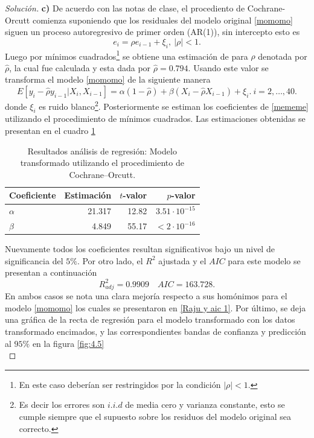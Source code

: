 \documentclass[10.5pt,notitlepage]{article}
\newenvironment{solucion}
  {\begin{proof}[Solución]}
  {\end{proof}}
\newcommand{\abs}[1]{\left\lvert #1 \right\rvert}
\theoremstyle{plain}
\begin{document}
\begin{solucion}
\noindent \textbf{c)} De acuerdo con las notas de clase, el procediento de Cochrane-Orcutt comienza suponiendo que los residuales del modelo original \eqref{momomo} siguen un proceso autoregresivo de primer orden (AR(1)), sin intercepto esto es 
\begin{equation*}
    e_i = \rho e_{i-1} + \xi_i, \ \abs{\rho} < 1.
\end{equation*}
Luego por mínimos cuadrados\footnote{En este caso deberían ser restringidos por la condición \(\abs{\rho} < 1\).} se obtiene una estimación de para \(\rho\) denotada por \(\hat{\rho}\), la cual fue calculada y esta dada por \(\hat{\rho} = 0.794\). Usando este valor se transforma el modelo \eqref{momomo} de la siguiente manera
\begin{equation}\label{mememe}
    E[y_{i} - \hat{\rho} y_{i-1}|X_{i} , X_{i-1}]  = \alpha(1 - \hat{\rho}) + \beta(X_{i} - \hat{\rho}X_{i - 1}) + \xi_{i}. \ i = 2, \hdots, 40.
\end{equation}
donde \(\xi_{i}\) es ruido blanco\footnote{Es decir los errores son \(i.i.d\) de media cero y varianza constante, esto se cumple siempre que el supuesto sobre los residuos del modelo original sea correcto.}. Posteriormente se estiman los coeficientes de \eqref{mememe} utilizando el procedimiento de mínimos cuadrados. Las estimaciones obtenidas se presentan en el cuadro \ref{tab:reg4}
\begin{table}[H]
        \centering
        \begin{tabular}{@{}l@{\hskip 0.3in}r@{\hskip 0.3in}r@{\hskip 0.3in}r@{}}
            \toprule
            Coeficiente& Estimación & \(t\)-valor& \(p\)-valor \\
            \midrule
            \(\alpha\) & 21.317 & 12.82 & \(3.51\cdot10^{-15}\) \\ 
            \(\beta\) &  4.849 & 55.17 & \(< 2\cdot10^{-16}\)\\ 
            \bottomrule
        \end{tabular}
        \caption{Resultados análisis de regresión: Modelo transformado utilizando el procedimiento de Cochrane–Orcutt.}
        \label{tab:reg4}
\end{table}
Nuevamente todos los coeficientes resultan significativos bajo un nivel de significancia del \(5\%\). Por otro lado, el \(R^2\) ajustada y el \(AIC\) para este modelo se presentan a continuación
\begin{equation*}
    R^{2}_{adj} =0.9909 \quad AIC = 163.728.
\end{equation*}
En ambos casos se nota una clara mejoría respecto a sus homónimos para el modelo \eqref{momomo} los cuales se presentaron en \eqref{Raju y aic 1}. Por último, se deja una gráfica de la recta de regresión para el modelo transformado con los datos transformado encimados, y las correspondientes bandas de confianza y predicción al \(95\%\) en la figura \ref{fig:4.5} \\

\end{solucion}
\end{document}
